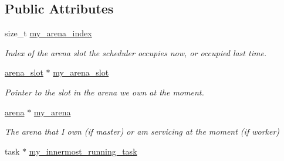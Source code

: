 \subsection*{Public Attributes}
\begin{DoxyCompactItemize}
\item 
\hypertarget{structtbb_1_1internal_1_1scheduler__state_a35aa72cfdda3b500e908925a3d6da747}{}size\+\_\+t \hyperlink{structtbb_1_1internal_1_1scheduler__state_a35aa72cfdda3b500e908925a3d6da747}{my\+\_\+arena\+\_\+index}\label{structtbb_1_1internal_1_1scheduler__state_a35aa72cfdda3b500e908925a3d6da747}

\begin{DoxyCompactList}\small\item\em Index of the arena slot the scheduler occupies now, or occupied last time. \end{DoxyCompactList}\item 
\hypertarget{structtbb_1_1internal_1_1scheduler__state_a6f2fdcecd347bf767e89fda580545c1a}{}\hyperlink{structtbb_1_1internal_1_1arena__slot}{arena\+\_\+slot} $\ast$ \hyperlink{structtbb_1_1internal_1_1scheduler__state_a6f2fdcecd347bf767e89fda580545c1a}{my\+\_\+arena\+\_\+slot}\label{structtbb_1_1internal_1_1scheduler__state_a6f2fdcecd347bf767e89fda580545c1a}

\begin{DoxyCompactList}\small\item\em Pointer to the slot in the arena we own at the moment. \end{DoxyCompactList}\item 
\hypertarget{structtbb_1_1internal_1_1scheduler__state_a6b830853cb0386a2b8744d4c7dff3a80}{}\hyperlink{classtbb_1_1internal_1_1arena}{arena} $\ast$ \hyperlink{structtbb_1_1internal_1_1scheduler__state_a6b830853cb0386a2b8744d4c7dff3a80}{my\+\_\+arena}\label{structtbb_1_1internal_1_1scheduler__state_a6b830853cb0386a2b8744d4c7dff3a80}

\begin{DoxyCompactList}\small\item\em The arena that I own (if master) or am servicing at the moment (if worker) \end{DoxyCompactList}\item 
\hypertarget{structtbb_1_1internal_1_1scheduler__state_aac9af4d8baddbbc2af433e11297be8a5}{}task $\ast$ \hyperlink{structtbb_1_1internal_1_1scheduler__state_aac9af4d8baddbbc2af433e11297be8a5}{my\+\_\+innermost\+\_\+running\+\_\+task}\label{structtbb_1_1internal_1_1scheduler__state_aac9af4d8baddbbc2af433e11297be8a5}


\end{DoxyCompactItemize}
